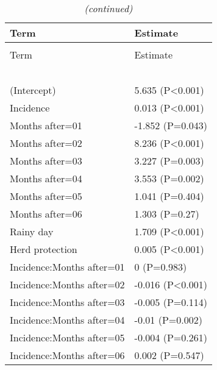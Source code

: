 \documentclass[]{article}
\begin{document}
\begin{longtable}[t]{ll}
\caption{\label{tab:unnamed-chunk-93}}\\
\toprule
Term & Estimate\\
\midrule
\endfirsthead
\caption[]{ \textit{(continued)}}\\
\toprule
Term & Estimate\\
\midrule
\endhead
\
\endfoot
\bottomrule
\endlastfoot
\addlinespace[1.5em]
\multicolumn{2}{l}{\textbf{Permanent field worker}}\\
\hspace{1em}(Intercept) & 5.635 (P<0.001)\\
\hspace{1em}Incidence & 0.013 (P<0.001)\\
\hspace{1em}Months after=01 & -1.852 (P=0.043)\\
\hspace{1em}Months after=02 & 8.236 (P<0.001)\\
\hspace{1em}Months after=03 & 3.227 (P=0.003)\\
\hspace{1em}Months after=04 & 3.553 (P=0.002)\\
\hspace{1em}Months after=05 & 1.041 (P=0.404)\\
\hspace{1em}Months after=06 & 1.303 (P=0.27)\\
\hspace{1em}Rainy day & 1.709 (P<0.001)\\
\hspace{1em}Herd protection & 0.005 (P<0.001)\\
\hspace{1em}Incidence:Months after=01 & 0 (P=0.983)\\
\hspace{1em}Incidence:Months after=02 & -0.016 (P<0.001)\\
\hspace{1em}Incidence:Months after=03 & -0.005 (P=0.114)\\
\hspace{1em}Incidence:Months after=04 & -0.01 (P=0.002)\\
\hspace{1em}Incidence:Months after=05 & -0.004 (P=0.261)\\
\hspace{1em}Incidence:Months after=06 & 0.002 (P=0.547)\\

\end{longtable}
\end{document}

